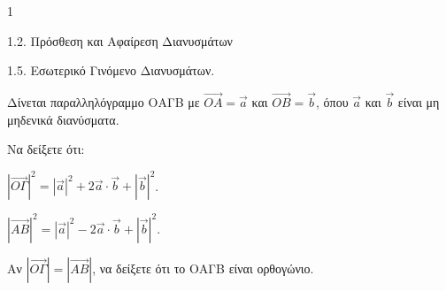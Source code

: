 \begin{ylh}{1}
    \item 1.2. Πρόσθεση και Αφαίρεση Διανυσμάτων
    \item 1.5. Εσωτερικό Γινόμενο Διανυσμάτων.
\end{ylh}
Δίνεται παραλληλόγραμμο ΟΑΓΒ με $\vec{OA} = \vec{a}$ και $\vec{OB} = \vec{b}$, όπου $\vec{a}$ και $\vec{b}$ είναι μη μηδενικά διανύσματα.
\begin{alist}
\item Να δείξετε ότι:
    \begin{rlist}
    \item $|\vec{O\Gamma}|^2 = |\vec{a}|^2 + 2\vec{a} \cdot \vec{b} + |\vec{b}|^2$. 
    \item $|\vec{AB}|^2 = |\vec{a}|^2 - 2\vec{a} \cdot \vec{b} + |\vec{b}|^2$. 
    \end{rlist}
\item Αν $|\vec{O\Gamma}| = |\vec{AB}|$, να δείξετε ότι το ΟΑΓΒ είναι ορθογώνιο. 
\end{alist}